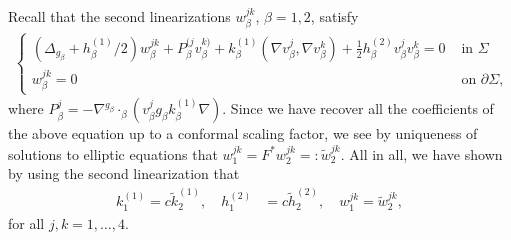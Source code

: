 \documentclass[12pt]{amsart}
\def\p{\partial}
\theoremstyle{definition}
\theoremstyle{remark}
\newcommand{\eps}{\epsilon}
\begin{document}
Recall that the second linearizations $w_\beta^{jk}$, $\beta =1,2$,  %
 satisfy %
 \begin{equation*}
 \begin{aligned}
		\begin{cases}
  (\Delta_{g_\beta}+h_\beta^{(1)}/2)w_\beta^{jk}+P_\beta^{(j}v_\beta^{k)}+k_\beta^{(1)}(\nabla v_\beta^{j},\nabla v_\beta^{k})+\frac{1}{2}h_\beta^{(2)}v_\beta^{j}v_\beta^{k}= 0& \text{ in } \Sigma \\
  w_\beta^{jk}=0
			&\text{ on }\p \Sigma,
  		\end{cases}
	\end{aligned}
 \end{equation*}
 where $P_\beta^j=-\nabla^{g_\beta}\cdot_\beta (v_\beta^jg_\beta k_\beta^{(1)}\nabla)$. Since we have recover all the coefficients of the above equation up to a conformal scaling factor, we see by uniqueness of solutions to elliptic equations that $w_1^{jk}=F^*w_2^{jk}=:\tilde w_2^{jk}$. All in all, we have shown by using the second linearization that
 \begin{align*}
  k_1^{(1)}=c\tilde k_2^{(1)} , \quad   h^{(2)}_1&=c\tilde h^{(2)}_2, \quad w_1^{jk}=\tilde w_2^{jk},
 \end{align*}
 for all $j,k=1,\ldots,4$.


 
\end{document}
